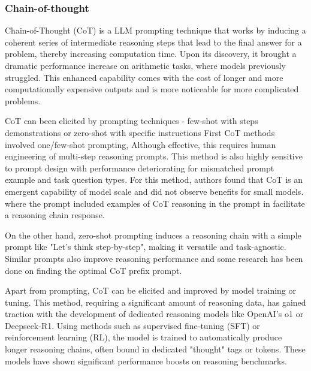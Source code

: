 \subsubsection{Chain-of-thought}\label{sec:cot}
Chain-of-Thought\cite{wei2023chainofthoughtpromptingelicitsreasoning} (CoT) is a LLM prompting technique that works by inducing a coherent series of intermediate 
reasoning steps that lead to the final answer for a problem, thereby increasing computation time. 
Upon its discovery, it brought a dramatic performance increase on arithmetic tasks, where models previously struggled.
This enhanced capability comes with the cost of longer and more computationally expensive outputs\cite{brown2024largelanguagemonkeysscaling} and
is more noticeable for more complicated problems\cite{wei2023chainofthoughtpromptingelicitsreasoning}. 

CoT can been elicited by prompting techniques - few-shot with steps demonstrations or 
zero-shot with specific instructions\cite{wang2024chainofthoughtreasoningprompting}
First CoT methods\cite{wei2023chainofthoughtpromptingelicitsreasoning} involved one/few-shot prompting, 
Although effective, this requires human engineering of multi-step reasoning prompts.
This method is also highly sensitive to prompt design with performance deteriorating 
for mismatched prompt example and task question types\cite{NEURIPS2022_8bb0d291}.
For this method, authors found that CoT is an emergent capability of model scale 
and did not observe benefits for small models\cite{wei2023chainofthoughtpromptingelicitsreasoning}.
where the prompt included examples of CoT reasoning in the prompt in facilitate a reasoning chain response.

On the other hand, zero-shot prompting induces a reasoning chain with a simple prompt like "Let's think step-by-step",
making it versatile and task-agnostic\cite{NEURIPS2022_8bb0d291}. Similar prompts also improve reasoning performance and 
some research\cite{yang2024largelanguagemodelsoptimizers} has been done on finding the optimal CoT prefix prompt.

Apart from prompting, CoT can be elicited and improved by model training or tuning. 
This method, requiring a significant amount of reasoning data\cite{wang2024chainofthoughtreasoningprompting},
has gained traction with the development of dedicated reasoning models like OpenAI's o1\cite{openai2024openaio1card} or Deepseek-R1\cite{deepseekai2025deepseekr1incentivizingreasoningcapability}.
Using methods such as supervised fine-tuning (SFT) or reinforcement learning (RL), the model is trained to
automatically produce longer reasoning chains, often bound in dedicated "thought" tags or tokens. 
These models have shown significant performance boosts on reasoning benchmarks\cite{openai2024openaio1card}\cite{deepseekai2025deepseekr1incentivizingreasoningcapability}.

